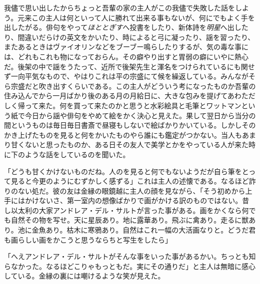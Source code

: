 \documentclass[12pt, openright]{book}
\begin{document}
我儘で思い出したからちょっと吾輩の家の主人がこの我儘で失敗した話をしよう。元来この主人は何といって人に勝れて出来る事もないが、何にでもよく手を出したがる。俳句をやって\emph{ほととぎす}へ投書をしたり、新体詩を\emph{明星}へ出したり、間違いだらけの英文をかいたり、時によると弓に凝ったり、謡を習ったり、またあるときはヴァイオリンなどをブーブー鳴らしたりするが、気の毒な事には、どれもこれも物になっておらん。その癖やり出すと胃弱の癖にいやに熱心だ。後架の中で謡をうたって、近所で後架先生と渾名をつけられているにも関せず一向平気なもので、やはりこれは平の宗盛にて候を繰返している。みんながそら宗盛だと吹き出すくらいである。この主人がどういう考になったものか吾輩の住み込んでから一月ばかり後のある月の月給日に、大きな包みを提げてあわただしく帰って来た。何を買って来たのかと思うと水彩絵具と毛筆とワットマンという紙で今日から謡や俳句をやめて絵をかく決心と見えた。果して翌日から当分の間というものは毎日毎日書斎で昼寝もしないで絵ばかりかいている。しかしそのかき上げたものを見ると何をかいたものやら誰にも鑑定がつかない。当人もあまり甘くないと思ったものか、ある日その友人で美学とかをやっている人が来た時に下のような話をしているのを聞いた。

「どうも甘くかけないものだね。人のを見ると何でもないようだが自ら筆をとって見ると今更のようにむずかしく感ずる」これは主人の述懐である。なるほど詐りのない処だ。彼の友は金縁の眼鏡越に主人の顔を見ながら、「そう初めから上手にはかけないさ、第一室内の想像ばかりで画がかける訳のものではない。昔し以太利の大家アンドレア・デル・サルトが言った事がある。画をかくなら何でも自然その物を写せ。天に星辰あり。地に露華あり。飛ぶに禽あり。走るに獣あり。池に金魚あり。枯木に寒鴉あり。自然はこれ一幅の大活画なりと。どうだ君も画らしい画をかこうと思うならちと写生をしたら」

「へえアンドレア・デル・サルトがそんな事をいった事があるかい。ちっとも知らなかった。なるほどこりゃもっともだ。実にその通りだ」と主人は無暗に感心している。金縁の裏には嘲けるような笑が見えた。
\end{document}
